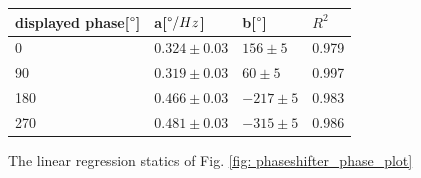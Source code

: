\documentclass{article}
\begin{document}
  \begin{figure}[H]
    \begin{tabular}{  m{3cm} | m{3cm} | m{3cm} | m{3cm}  } 

      displayed phase[$\degree$]& a[$\degree/Hz$] & b[$\degree$] & $R^2$\\ 
      \hline
        0 & $0.324 \pm 0.03 $ & $ 156 \pm 5$& 0.979\\
      \hline
        90 & $0.319 \pm 0.03$& $60 \pm 5$& 0.997\\
      \hline
      180 & $0.466 \pm 0.03$& $-217 \pm 5$& 0.983\\
      \hline
      270 & $0.481 \pm 0.03$& $-315 \pm 5$& 0.986
    \end{tabular}
    \caption{The linear regression statics of Fig. \ref{fig: phaseshifter_phase_plot}}
    \label{fig: phase shifter linear regression results}
\end{figure}
\end{document}
